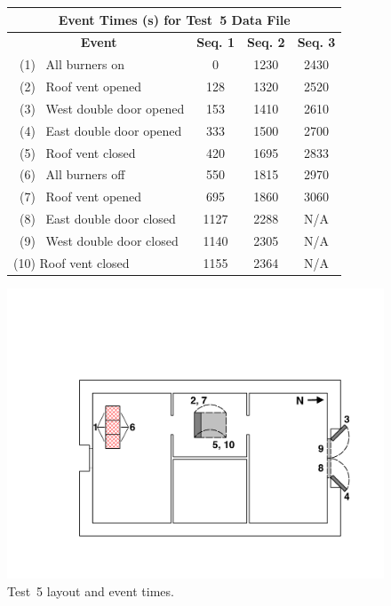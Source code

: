 \documentclass[12pt,oneside]{book}
\begin{document}
\begin{figure}[!ht]
\begin{minipage}[b]{0.8\columnwidth}
	\begin{flushleft}
	\begin{tabular}{lccc}
	\multicolumn{4}{c}{\normalsize Event Times (s) for Test~5 Data File} \\
	\toprule
	\multicolumn{1}{c}{\textbf{Event}} 	& \textbf{Seq. 1} & \textbf{Seq. 2} & \textbf{Seq. 3} \\
	\midrule
	~(1)~ All burners on 				& 	0			  &	   1230			&	   2430		\\
	~(2)~ Roof vent opened 				&   128			  &    1320			&	   2520		\\
	~(3)~ West double door opened 		&	153			  &	   1410	 		&	   2610 	\\
	~(4)~ East double door opened 		&   333			  &    1500			&	   2700		\\
	~(5)~ Roof vent closed		 		&   420			  &    1695			&	   2833		\\
	~(6)~ All burners off 				&   550			  &    1815			&	   2970		\\
	~(7)~ Roof vent opened				& 	695 		  &	   1860			&	   3060		\\
	~(8)~ East double door closed		& 	1127 		  &	   2288			&	   N/A		\\
	~(9)~ West double door closed		& 	1140 		  &	   2305			&	   N/A		\\
	(10) Roof vent closed		 		&   1155		  &    2364			&	   N/A		\\
	\bottomrule
	\end{tabular}
	\end{flushleft}
\end{minipage}
\begin{minipage}[b]{0.9\columnwidth}
	\vspace{15pt}
	\centering
	\includegraphics[width=0.86\columnwidth]{../Figures/Floor_Plans/East_Structure_Test_5}
\end{minipage}
\caption{Test~5 layout and event times.}
\label{fig:east_test_5}
\end{figure}
\end{document}
